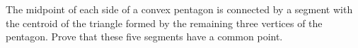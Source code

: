 The midpoint of each side of a convex pentagon is connected by a segment with the centroid of the triangle formed by the remaining three vertices of the pentagon. Prove that these five segments have a common point.